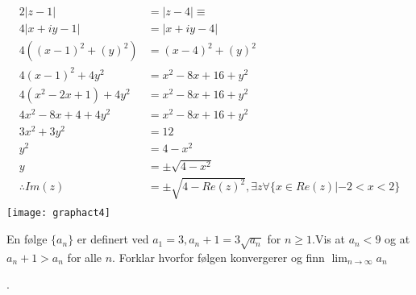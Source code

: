 \documentclass{myassignment}
\begin{document}
	\begin{answer}
		\begin{multicols}{2}
			\begin{align*}
				2|z-1| &= |z-4| \equiv \\[2em]
				4|x+iy-1| &= |x+iy-4|\\[1em]
				4((x-1)^2+(y)^2) &= (x-4)^2+(y)^2 \\[1em]
				4(x-1)^2+4y^2 &= x^2-8x+16+y^2 \\[1em]
				4(x^2-2x+1)+4y^2 &= x^2-8x+16+y^2 \\[1em]
				4x^2-8x+4 + 4y^2 &= x^2-8x+16+y^2 \\[1em]
				3x^2 + 3y^2 &= 12 \\[1em]
				y^2 &= 4 - x^2 \\[1em]
				y &= \pm \sqrt{4 - x^2}\\[1em]
				\therefore Im(z) &= \pm\sqrt{4 - Re(z)^2}, \exists z \forall \{x \in Re(z) | -2 < x <2 \} \\[1em]
			\end{align*}
		\columnbreak
		\texttt{[image: graphact4]}

		\end{multicols}
	\end{answer}


	\begin{problem}
		En følge $\{ a_n \}$ er definert ved $a_1 = 3, a_n + 1 = 3\sqrt{a_n}$ for $n \geq 1$.Vis at $a_n < 9$ og at $a_n+1 > a_n$ for alle $n$. Forklar hvorfor følgen konvergerer og finn $\lim_{n \rightarrow \infty}{a_n}$
	\end{problem}

	\begin{answer}

	\end{answer}.
\end{document}
